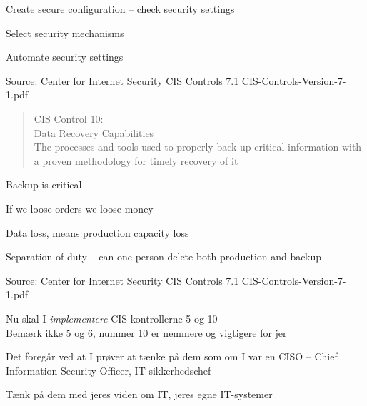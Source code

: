 \documentclass[Screen16to9,17pt]{foils}
\begin{document}
\begin{list1}
\item Create secure configuration -- check security settings
\item Select security mechanisms
\item Automate security settings
\end{list1}

Source: Center for Internet Security CIS Controls 7.1 CIS-Controls-Version-7-1.pdf


\begin{quote}
CIS Control 10:\\
Data Recovery Capabilities\\
The processes and tools used to properly back up critical information with a proven methodology
for timely recovery of it
\end{quote}

\begin{list1}
\item Backup is critical
\item If we loose orders we loose money
\item Data loss, means production capacity loss
\item Separation of duty -- can one person delete both production and backup
\end{list1}

Source: Center for Internet Security CIS Controls 7.1 CIS-Controls-Version-7-1.pdf





\begin{list2}
\item Nu skal I \emph{implementere} CIS kontrollerne 5 og 10\\
Bemærk ikke 5 og 6, nummer 10 er nemmere og vigtigere for jer
\item Det foregår ved at I prøver at tænke på dem som om I var en CISO -- Chief Information Security Officer, IT-sikkerhedschef
\item Tænk på dem med jeres viden om IT, jeres egne IT-systemer
\end{list2}




\end{document}
